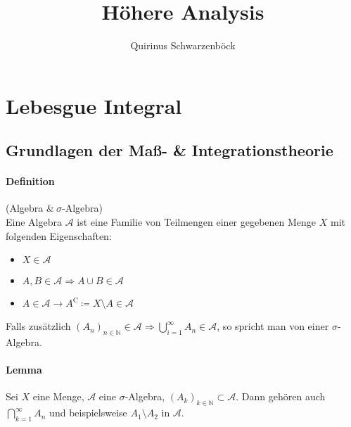 \documentclass[12pt,a4paper,fleqn]{article}
\author{Quirinus Schwarzenböck}
\title{Höhere Analysis}
\begin{document}
\maketitle
\newpage

\tableofcontents
\newpage

\section{Lebesgue Integral}

\subsection{Grundlagen der Maß- \& Integrationstheorie}

\paragraph{Definition}(Algebra $\&\ \sigma$-Algebra)\\
Eine Algebra $\mathcal{A}$ ist eine Familie von Teilmengen einer gegebenen Menge $\mathit{X}$ mit folgenden Eigenschaften:
\begin{itemize}
\item $\mathit{X} \in \mathcal{A}$
\item $A, B \in \mathcal{A} \Rightarrow A\cup B \in \mathcal{A}$
\item $\mathit{A} \in \mathcal{A} \rightarrow \mathit{A}^\mathrm{C} \coloneqq \mathit{X}\setminus\mathit{A} \in \mathcal{A}$
\end{itemize}
Falls zusätzlich $(\mathit{A}_n)_{n \in \mathbb{N}} \in \mathcal{A} \Rightarrow \bigcup_{i=1}^\infty A_n \in \mathcal{A}$, so spricht man von einer $\sigma$-Algebra.

\paragraph{Lemma}
Sei $\mathit{X}$ eine Menge, $\mathcal{A}$ eine $\sigma$-Algebra, $(\mathit{A}_k)_{k \in \mathbb{N}} \subset \mathcal{A}$. Dann gehören auch $\bigcap^\infty_{k=1} A_n$ und beispielsweise $A_1 \setminus A_2$ in $\mathcal{A}$.
\end{document}
